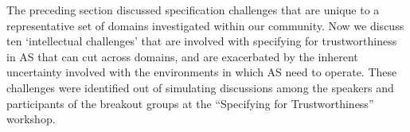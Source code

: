 \documentclass[sigconf,nonacm]{acmart}%
\begin{document}
The preceding section discussed specification challenges that are unique to a representative set of domains investigated within our community. Now we discuss ten `intellectual challenges' that are involved with specifying for trustworthiness in AS that can cut across domains, and are exacerbated by the inherent uncertainty involved with the environments in which AS need to operate. 
These challenges were identified out of simulating discussions among the speakers and participants of the breakout groups at the ``Specifying for Trustworthiness'' workshop. 
\end{document}
